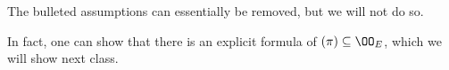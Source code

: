 \documentclass[../notes.tex]{subfiles}
\begin{document}
\begin{remark}
	The bulleted assumptions can essentially be removed, but we will not do so.
\end{remark}
\begin{remark}
	In fact, one can show that there is an explicit formula of $(\pi)\subseteq\OO_E$, which we will show next class.
\end{remark}
\end{document}
